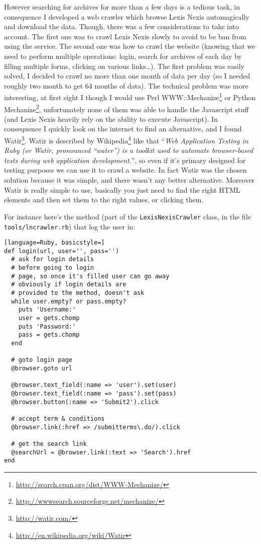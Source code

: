 \documentclass[12pt,a4wide]{report}
\begin{document}
			However searching for archives for more than a few days is a tedious task, in consequence I developed a web crawler which browse Lexis Nexis automagically and download the data. Though, there was a few considerations to take into account. The first one was to crawl Lexis Nexis slowly to avoid to be ban from using the service. The second one was how to crawl the website (knowing that we need to perform multiple operations: login, search for archives of each day by filling multiple forms, clicking on various links\ldots). The first problem was easily solved, I decided to crawl no more than one month of data per day (so I needed roughly two month to get 64 months of data). The technical problem was more interesting, at first sight I though I would use Perl WWW::Mechanize\footnote{\url{http://search.cpan.org/dist/WWW-Mechanize/}} or Python Mechanize\footnote{\url{http://wwwsearch.sourceforge.net/mechanize/}}, unfortunately none of them was able to handle the Javascript stuff (and Lexis Nexis heavily rely on the ability to execute Javascript). In consequence I quickly look on the internet to find an alternative, and I found Watir\footnote{\url{http://watir.com/}}. Watir is described by Wikipedia\footnote{\url{http://en.wikipedia.org/wiki/Watir}} like that ``\emph{Web Application Testing in Ruby (or Watir, pronounced ``water'') is a toolkit used to automate browser-based tests during web application development.}'', so even if it's primary designed for testing purposes we can use it to crawl a website. In fact Watir was the chosen solution because it was simple, and there wasn't any better alternative. Moreover Watir is really simple to use, basically you just need to find the right HTML elements and then set them to the right values, or clicking them.
			
			For instance here's the method (part of the \lstinline!LexisNexisCrawler! class, in the file \lstinline!tools/lncrawler.rb!) that log the user in:
			
			\begin{lstlisting}[language=Ruby, basicstyle=]
def login(url, user='', pass='')
  # ask for login details
  # before going to login
  # page, so once it's filled user can go away
  # obviously if login details are 
  # provided to the method, doesn't ask
  while user.empty? or pass.empty?
    puts 'Username:'
    user = gets.chomp
    puts 'Password:'
    pass = gets.chomp
  end

  # goto login page
  @browser.goto url

  @browser.text_field(:name => 'user').set(user)
  @browser.text_field(:name => 'pass').set(pass)
  @browser.button(:name => 'Submit2').click
                                                                                                 
  # accept term & conditions
  @browser.link(:href => /submitterms\.do/).click

  # get the search link
  @searchUrl = @browser.link(:text => 'Search').href
end
			\end{lstlisting}
			
\end{document}

